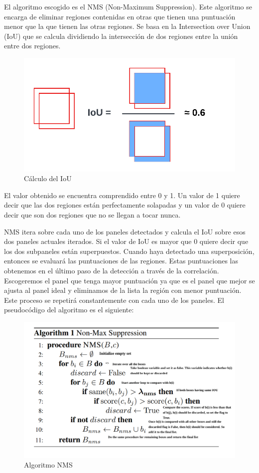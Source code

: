 \documentclass[a4paper, 12pt]{article}
\begin{document}
El algoritmo escogido es el NMS (Non-Maximum Suppression). Este algoritmo se encarga de eliminar regiones contenidas en otras que tienen una puntuación menor que la que tienen las otras regiones. Se basa en la Intersection over Union (IoU) que se calcula dividiendo la intersección de dos regiones entre la unión entre dos regiones. 
\begin{figure}[h]
	\centering
	\includegraphics[width=0.5\linewidth]{img/iou.png}
	\caption{Cálculo del IoU}
	\label{fig:iou}
\end{figure}

El valor obtenido se encuentra comprendido entre 0 y 1. Un valor de 1 quiere decir que las dos regiones están perfectamente solapadas y un valor de 0 quiere decir que son dos regiones que no se llegan a tocar nunca. 

NMS itera sobre cada uno de los paneles detectados y calcula el IoU sobre esos dos paneles actuales iterados. Si el valor de IoU es mayor que 0 quiere decir que los dos subpaneles están superpuestos. Cuando haya detectado una superposición, entonces se evaluará las puntuaciones de las regiones. Estas puntuaciones las obtenemos en el último paso de la detección a través de la correlación. Escogeremos el panel que tenga mayor puntuación ya que es el panel que mejor se ajusta al panel ideal y eliminamos de la lista la región con menor puntuación. Este proceso se repetirá constantemente con cada uno de los paneles. El pseudocódigo del algoritmo es el siguiente:
\begin{figure}[h]
	\centering
	\includegraphics[width=0.7\linewidth]{img/nms.png}
	\caption{Algoritmo NMS}
	\label{fig:nms}
\end{figure}
\end{document}
